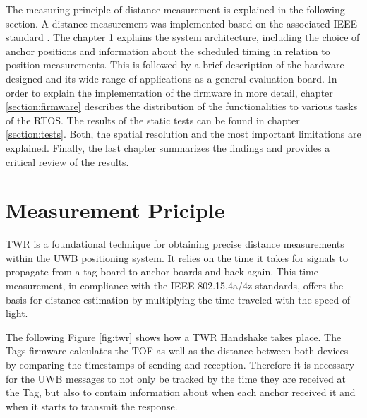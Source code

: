 \documentclass[conference, a4paper]{IEEEtran}
\begin{document}
The measuring principle of distance measurement is explained in the following section.
A distance measurement was implemented based on the associated IEEE standard  \cite{IEEE802154a} \cite{IEEE802154z}.
The chapter \ref{Section:principle} explains the system architecture,
including the choice of anchor positions and 
information about the scheduled timing in relation to position measurements.
This is followed by a brief description of the hardware designed and
its wide range of applications as a general evaluation board.
In order to explain the implementation of the firmware in more detail,
chapter \ref{section:firmware} describes the distribution of the functionalities to various tasks of the \ac{RTOS}.
The results of the static tests can be found in chapter \ref{section:tests}.
Both, the spatial resolution and the most important limitations are explained.
Finally, the last chapter summarizes the findings and provides a critical review of the results.



\section{Measurement Priciple}\label{Section:principle}
\acf{TWR} is a foundational technique for obtaining precise distance measurements within the UWB positioning system.
It relies on the time it takes for signals to propagate from a tag board to anchor boards and back again.
This time measurement, in compliance with the IEEE 802.15.4a/4z standards\cite{IEEE802154a}\cite{IEEE802154z}, offers the basis for distance estimation by multiplying the time traveled with the speed of light.

The following Figure \ref{fig:twr} shows how a \ac{TWR} Handshake takes place.
The Tags firmware calculates the \acf{TOF} as well as the distance between both devices by comparing the timestamps of sending and reception. 
Therefore it is necessary for the \ac{UWB} messages to not only be tracked by the time they are received at the Tag, but also to contain information about when each anchor received it and when it starts to transmit the response. 
\end{document}
